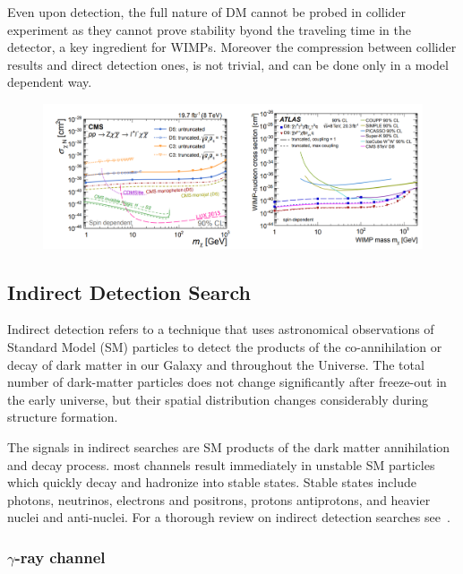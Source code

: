 Even upon detection, the full nature of DM cannot be probed in collider experiment as they cannot prove stability byond the traveling time in the detector, a key ingredient for WIMPs. Moreover the compression between collider results and direct detection ones, is not trivial, and can be done only in a model dependent way.
\begin{figure}[]
	\centering
	\includegraphics[width=\textwidth]{figs/ColliderLimit.png}
	\label{fig:ColliderLimit}
\end{figure}  

\subsection{Indirect Detection Search}
\label{subsec:indirect}
Indirect detection refers to a technique that uses astronomical observations
of Standard Model (SM) particles to detect the products of the co-annihilation or decay of dark matter in our Galaxy and throughout the Universe. The total number of dark-matter particles does not change significantly after freeze-out in the early universe, but their spatial distribution changes considerably during structure formation. 

The signals in indirect searches are SM products of the dark matter annihilation and decay process. most channels result immediately in unstable SM particles which quickly decay and hadronize into stable states. Stable states include photons, neutrinos, electrons and positrons, protons antiprotons, and heavier nuclei and anti-nuclei. For a thorough review on indirect detection searches see~\cite{Conrad:2014tla}.

\subsubsection{$\gamma$-ray channel}

